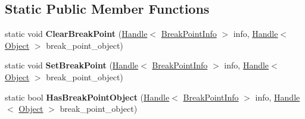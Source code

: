 \subsection*{Static Public Member Functions}
\begin{DoxyCompactItemize}
\item 
\hypertarget{classv8_1_1internal_1_1_break_point_info_ad36403b6aef5c298a27971fef29f845a}{}static void {\bfseries Clear\+Break\+Point} (\hyperlink{classv8_1_1internal_1_1_handle}{Handle}$<$ \hyperlink{classv8_1_1internal_1_1_break_point_info}{Break\+Point\+Info} $>$ info, \hyperlink{classv8_1_1internal_1_1_handle}{Handle}$<$ \hyperlink{classv8_1_1internal_1_1_object}{Object} $>$ break\+\_\+point\+\_\+object)\label{classv8_1_1internal_1_1_break_point_info_ad36403b6aef5c298a27971fef29f845a}

\item 
\hypertarget{classv8_1_1internal_1_1_break_point_info_ad9496b6de8a915c671c353d1ef3d379c}{}static void {\bfseries Set\+Break\+Point} (\hyperlink{classv8_1_1internal_1_1_handle}{Handle}$<$ \hyperlink{classv8_1_1internal_1_1_break_point_info}{Break\+Point\+Info} $>$ info, \hyperlink{classv8_1_1internal_1_1_handle}{Handle}$<$ \hyperlink{classv8_1_1internal_1_1_object}{Object} $>$ break\+\_\+point\+\_\+object)\label{classv8_1_1internal_1_1_break_point_info_ad9496b6de8a915c671c353d1ef3d379c}

\item 
\hypertarget{classv8_1_1internal_1_1_break_point_info_aa79786626248be34e202c696c7c10eeb}{}static bool {\bfseries Has\+Break\+Point\+Object} (\hyperlink{classv8_1_1internal_1_1_handle}{Handle}$<$ \hyperlink{classv8_1_1internal_1_1_break_point_info}{Break\+Point\+Info} $>$ info, \hyperlink{classv8_1_1internal_1_1_handle}{Handle}$<$ \hyperlink{classv8_1_1internal_1_1_object}{Object} $>$ break\+\_\+point\+\_\+object)\label{classv8_1_1internal_1_1_break_point_info_aa79786626248be34e202c696c7c10eeb}

\end{DoxyCompactItemize}
